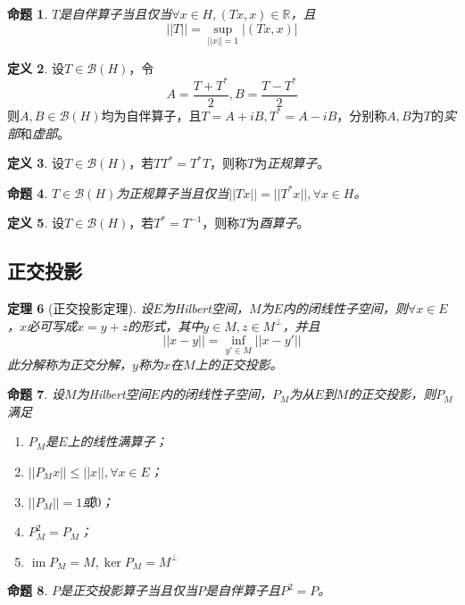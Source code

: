 \documentclass[winfonts,UTF8,c5size,a4paper,fancyhdr,hyperref,titlepage,nocap]{ctexart}
\theoremstyle{question}
\theoremstyle{theorem}
\newtheorem{thm}{定理}
\newtheorem{prop}[thm]{命题}
\theoremstyle{definition}
\newtheorem{defn}[thm]{定义}
\theoremstyle{remark}
\numberwithin{equation}{subsection}
\newcommand{\Real}{\mathbb{R}}
\newcommand{\red}{\color{red}}
\newcommand{\im}{\operatorname{im}}
\begin{document}
\begin{prop}
$T$是自伴算子当且仅当$\forall x\in H,(Tx,x)\in\Real$，且
\begin{equation*}
||T||=\sup_{||x||=1}|(Tx,x)|
\end{equation*}
\end{prop}

\begin{defn}
设$T\in\mathcal{B}(H)$，令
\begin{equation*}
A=\frac{T+T^{\ast}}{2}, B=\frac{T-T^{\ast}}{2}
\end{equation*}
则$A,B\in\mathcal{B}(H)$均为自伴算子，且$T=A+iB,T^{\ast}=A-iB$，分别称$A,B$为$T$的\emph{\red 实部}和\emph{\red 虚部}。
\end{defn}

\begin{defn}
设$T\in\mathcal{B}(H)$，若$TT^{\ast}=T^{\ast}T$，则称$T$为\emph{\red 正规算子}。
\end{defn}

\begin{prop}
  $T\in\mathcal{B}(H)$为正规算子当且仅当$||Tx||=||T^{\ast}x||,\forall x\in H$。
\end{prop}

\begin{defn}
设$T\in\mathcal{B}(H)$，若$T^{\ast}=T^{-1}$，则称$T$为\emph{\red 酉算子}。
\end{defn}

\subsection{正交投影}
\begin{thm}[正交投影定理]
  设$E$为Hilbert空间，$M$为$E$内的闭线性子空间，则$\forall x\in E$，$x$必可写成$x=y+z$的形式，其中$y\in M,z\in M^{\bot}$，并且
  \begin{equation*}
  ||x-y||=\inf_{y'\in M}||x-y'||
  \end{equation*}
  此分解称为{\red 正交分解}，$y$称为$x$在$M$上的{\red 正交投影}。
\end{thm}
\begin{prop}
  设$M$为Hilbert空间$E$内的闭线性子空间，$P_M$为从$E$到$M$的正交投影，则$P_M$满足
\begin{enumerate}[1)]
    \setlength{\itemindent}{2ex}
    \item $P_M$是$E$上的线性满算子；
    \item $||P_Mx||\leqslant||x||,\forall x\in E$；
    \item $||P_M||=1$或$0$；
    \item $P_M^2=P_M$；
    \item $\im P_M=M,\ker P_M=M^{\bot}$
\end{enumerate}
\end{prop}

\begin{prop}
  $P$是正交投影算子当且仅当$P$是自伴算子且$P^2=P$。
\end{prop}


\newpage
{}
{}
\printindex
\end{document}
